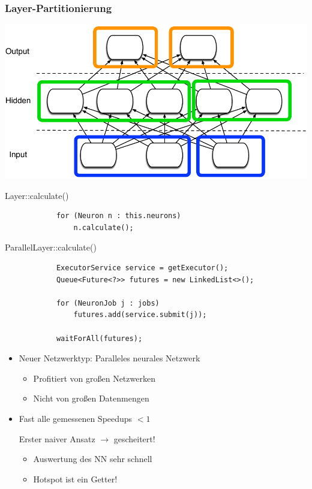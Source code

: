 \documentclass[18pt]{beamer}
\begin{document}
	\begin{frame}\frametitle{Layer-Partitionierung}
	    \includegraphics[scale=0.7]{Grafiken/Feingranular.pdf}
	
	\framebreak

		\begin{block}{Layer::calculate()}
			\begin{lstlisting}
			for (Neuron n : this.neurons) 
			    n.calculate();
	 		\end{lstlisting}
 		\end{block}

		\begin{block}{ParallelLayer::calculate()}
	 		\begin{lstlisting}
			ExecutorService service = getExecutor();
			Queue<Future<?>> futures = new LinkedList<>();

			for (NeuronJob j : jobs)
			    futures.add(service.submit(j));
			
			waitForAll(futures);
	 		\end{lstlisting}
	 	\end{block}

 		\framebreak
	
		\begin{itemize}
			\item Neuer Netzwerktyp: Paralleles neurales Netzwerk
			\begin{itemize}
				\item Profitiert von großen Netzwerken
				\item Nicht von großen Datenmengen
			\end{itemize}
			\item Fast alle gemessenen Speedups $<1$ 
			\begin{block}{Erster naiver Ansatz $\rightarrow$ gescheitert!}
				\begin{itemize}
					\item Auswertung des NN sehr schnell
					\item Hotspot ist ein Getter!
				\end{itemize}
			\end{block}


\end{itemize}
\end{frame}
\end{document}
